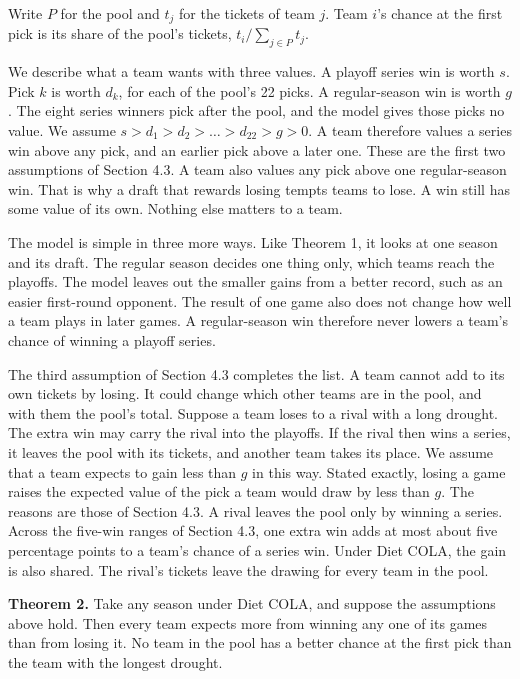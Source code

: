 \documentclass[11pt,letterpaper]{article}
\begin{document}
Write $P$ for the pool and $t_j$ for the tickets of team $j$. Team $i$'s chance at the first pick is its share of the pool's tickets, $t_i / \sum_{j \in P} t_j$.

We describe what a team wants with three values. A playoff series win is worth $s$. Pick $k$ is worth $d_k$, for each of the pool's 22 picks. A regular-season win is worth $g$. The eight series winners pick after the pool, and the model gives those picks no value. We assume $s > d_1 > d_2 > \dots > d_{22} > g > 0$. A team therefore values a series win above any pick, and an earlier pick above a later one. These are the first two assumptions of Section 4.3. A team also values any pick above one regular-season win. That is why a draft that rewards losing tempts teams to lose. A win still has some value of its own. Nothing else matters to a team.

The model is simple in three more ways. Like Theorem 1, it looks at one season and its draft. The regular season decides one thing only, which teams reach the playoffs. The model leaves out the smaller gains from a better record, such as an easier first-round opponent. The result of one game also does not change how well a team plays in later games. A regular-season win therefore never lowers a team's chance of winning a playoff series.

The third assumption of Section 4.3 completes the list. A team cannot add to its own tickets by losing. It could change which other teams are in the pool, and with them the pool's total. Suppose a team loses to a rival with a long drought. The extra win may carry the rival into the playoffs. If the rival then wins a series, it leaves the pool with its tickets, and another team takes its place. We assume that a team expects to gain less than $g$ in this way. Stated exactly, losing a game raises the expected value of the pick a team would draw by less than $g$. The reasons are those of Section 4.3. A rival leaves the pool only by winning a series. Across the five-win ranges of Section 4.3, one extra win adds at most about five percentage points to a team's chance of a series win. Under Diet COLA, the gain is also shared. The rival's tickets leave the drawing for every team in the pool.

\textbf{Theorem 2.} Take any season under Diet COLA, and suppose the assumptions above hold. Then every team expects more from winning any one of its games than from losing it. No team in the pool has a better chance at the first pick than the team with the longest drought.
\end{document}
